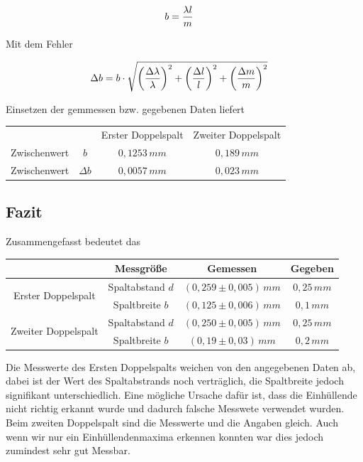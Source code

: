 \documentclass{article}
\begin{document}
\begin{align}
b &=  \frac{\lambda l}{m}
\notag
\end{align}

Mit dem Fehler

\begin{align}
\Delta b &= b \cdot \sqrt{
\left( \frac{\Delta \lambda}{\lambda} \right)^2 +
\left( \frac{\Delta l}{l} \right)^2 +
\left( \frac{\Delta m}{m} \right)^2
}
\notag
\end{align}

Einsetzen der gemmessen bzw. gegebenen Daten liefert
 
\begin{center}
\begin{tabular}{c c c c}
	&	& Erster Doppelspalt & Zweiter Doppelspalt \\
	Zwischenwert & \(b\)	& \( 0,1253\, mm\)	& \( 0,189\, mm \) \\  
	Zwischenwert & \(\Delta b\)	& \( 0,0057\, mm\)	& \( 0,023\, mm \)
\end{tabular}
\end{center}

\subsection{Fazit}

Zusammengefasst bedeutet das

\begin{center}
\begin{tabular}{c|c c c}
										&	Messgröße	& Gemessen & Gegeben \\ \hline
\multirow{2}{*}{Erster Doppelspalt}		& Spaltabstand \(d\)	& \( (0,259 \pm 0,005)\, mm \) & \(0,25\,mm\) \\
										& Spaltbreite \(b\)	& \( (0,125 \pm 0,006)\, mm \) & \(0,1\,mm\) \\	\hline
\multirow{2}{*}{Zweiter Doppelspalt}	& Spaltabstand \(d\)	& \( (0,250 \pm 0,005)\, mm \) & \(0,25\,mm\) \\
										& Spaltbreite \(b\)	& \( (0,19 \pm 0,03)\, mm \) & \(0,2\,mm\)
\end{tabular}
\end{center}

Die Messwerte des Ersten Doppelspalts weichen von den angegebenen Daten ab, dabei ist der Wert des Spaltabstrands noch verträglich, die Spaltbreite jedoch signifikant unterschiedlich. Eine mögliche Ursache dafür ist, dass die Einhüllende nicht richtig erkannt wurde und dadurch falsche Messwete verwendet wurden. Beim zweiten Doppelspalt sind die Messwerte und die Angaben gleich. Auch wenn wir nur ein Einhüllendenmaxima erkennen konnten war dies jedoch zumindest sehr gut Messbar.
\end{document}
